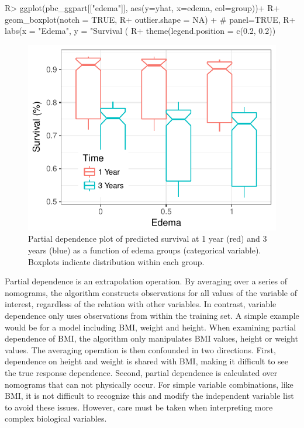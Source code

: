 \documentclass[article, nojss]{jss}
\begin{document}
\begin{Schunk}
\begin{Sinput}
R> ggplot(pbc_ggpart[["edema"]], aes(y=yhat, x=edema, col=group))+
R+   geom_boxplot(notch = TRUE,
R+                outlier.shape = NA) + # panel=TRUE,
R+   labs(x = "Edema", y = "Survival (%
R+   theme(legend.position = c(0.2, 0.2))
\end{Sinput}
\begin{figure}[!htb]

{\centering \includegraphics{rfs-pbc-partial-edema-1}

}

\caption[Partial dependence plot of predicted survival at 1 year (red) and 3 years (blue) as a function of edema groups (categorical variable)]{Partial dependence plot of predicted survival at 1 year (red) and 3 years (blue) as a function of edema groups (categorical variable). Boxplots indicate distribution within each group.}\label{fig:pbc-partial-edema}
\end{figure}
\end{Schunk}

Partial dependence is an extrapolation operation. By averaging over a
series of nomograms, the algorithm constructs observations for all
values of the variable of interest, regardless of the relation with
other variables. In contrast, variable dependence only uses observations
from within the training set. A simple example would be for a model
including BMI, weight and height. When examining partial dependence of
BMI, the algorithm only manipulates BMI values, height or weight values.
The averaging operation is then confounded in two directions. First,
dependence on height and weight is shared with BMI, making it difficult
to see the true response dependence. Second, partial dependence is
calculated over nomograms that can not physically occur. For simple
variable combinations, like BMI, it is not difficult to recognize this
and modify the independent variable list to avoid these issues. However,
care must be taken when interpreting more complex biological variables.
\end{document}
